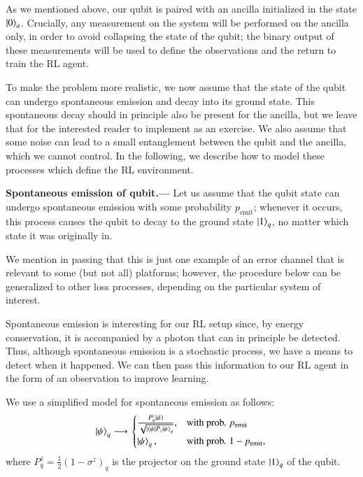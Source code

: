 As we mentioned above, our qubit is paired with an ancilla initialized in the state $\ket{0}_a$. Crucially, any measurement on the system will be performed on the ancilla only, in order to avoid collapsing the state of the qubit; the binary output of these measurements will be used to define the observations and the return to train the RL agent. 

To make the problem more realistic, we now assume that the state of the qubit can undergo spontaneous emission and decay into its ground state. This spontaneous decay should in principle also be present for the ancilla, but we leave that for the interested reader to implement as an exercise. We also assume that some noise can lead to a small entanglement between the qubit and the ancilla, which we cannot control. In the following, we describe how to model these processes which define the RL environment.  


\textbf{Spontaneous emission of qubit.---} Let us assume that the qubit state can undergo spontaneous emission with some probability $p_\text{emit}$; whenever it occurs, this process causes the qubit to decay to the ground state $\ket{1}_q$, no matter which state it was originally in.

We mention in passing that this is just one example of an error channel that is relevant to some (but not all) platforms; however, the procedure below can be generalized to other loss processes, depending on the particular system of interest.


Spontaneous emission is interesting for our RL setup since, by energy conservation, it is accompanied by a photon that can in principle be detected. 
Thus, although spontaneous emission is a stochastic process, we have a means to detect when it happened. We can then pass this information to our RL agent in the form of an observation to improve learning. 

We use a simplified model for spontaneous emission as follows:
\begin{equation}
    \ket{\psi}_q \longrightarrow 
\left.
  \begin{cases}
    \frac{P^z_q\ket{\psi}}{\sqrt{|\bra{\psi}P_z\ket{\psi}_q}}, & \text{with prob. } p_\text{emit}  \\
    \ket{\psi}_q, & \text{with prob. } 1-p_\text{emit},
  \end{cases}
  \right. 
\end{equation}
where $P^z_q = \frac{1}{2}(1 - \sigma^z)_q$ is the projector on the ground state $\ket{1}_q$ of the qubit.

